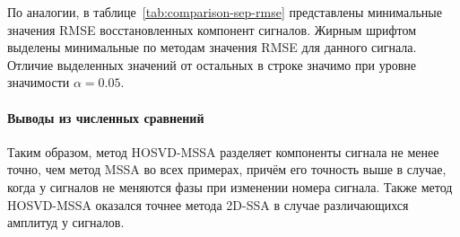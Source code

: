 \documentclass[specialist,
    substylefile = spbu_report.rtx,
    subf,href,colorlinks=true, 12pt]{disser}
\theoremstyle{plain}
\theoremstyle{definition}
\theoremstyle{remark}
\begin{document}
    По аналогии, в таблице~\ref{tab:comparison-sep-rmse} представлены минимальные значения RMSE восстановленных
    компонент сигналов.
    Жирным шрифтом выделены минимальные по методам значения RMSE для данного сигнала.
    Отличие выделенных значений от остальных в строке значимо при уровне значимости $\alpha=0.05$.
    
    \paragraph{Выводы из численных сравнений}\label{par:numerical-comparison-sep-res}
    Таким образом, метод HOSVD-MSSA разделяет компоненты сигнала не менее точно, чем метод MSSA во всех примерах, 
    причём его точность выше в случае, когда у сигналов не меняются фазы при изменении номера сигнала.
    Также метод HOSVD-MSSA оказался точнее метода 2D-SSA в случае различающихся
    амплитуд у сигналов.
    
\end{document}
